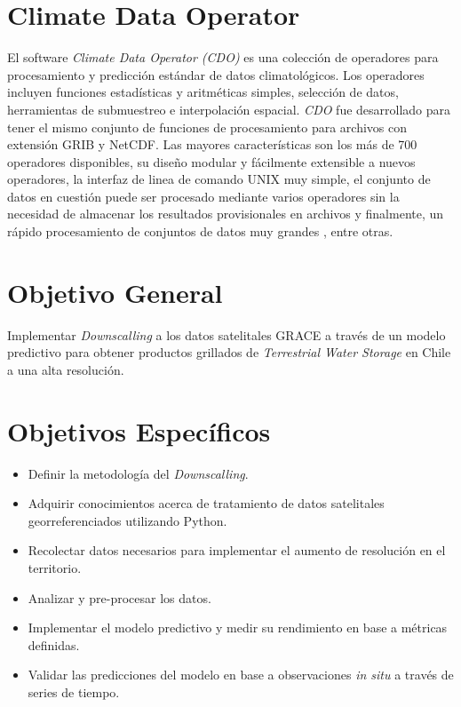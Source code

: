 %
%
%
%
\section{Climate Data Operator}
El software \textit{Climate Data Operator (CDO)} es una colección de operadores para procesamiento y predicción estándar de datos climatológicos.
Los operadores incluyen funciones estadísticas y aritméticas simples, selección de datos, herramientas de submuestreo e interpolación espacial.
\textit{CDO} fue desarrollado para tener el mismo conjunto de funciones de procesamiento para archivos con extensión GRIB y NetCDF. Las mayores características son
los más de 700 operadores disponibles, su diseño modular y fácilmente extensible a nuevos operadores, la interfaz de linea de comando UNIX muy simple,
el conjunto de datos en cuestión puede ser procesado mediante varios operadores sin la necesidad de almacenar los resultados provisionales en archivos y finalmente, un rápido procesamiento
de conjuntos de datos muy grandes \cite{16}, entre otras.
%
%
%
%
\section{Objetivo General}

Implementar \textit{Downscalling} a los datos satelitales GRACE a través de un modelo predictivo para obtener 
productos grillados de \textit{Terrestrial Water Storage} en Chile a una alta resolución.
%
%
%
%
\section{Objetivos Específicos}
\begin{itemize}
    \item Definir la metodología del \textit{Downscalling}.
    \item Adquirir conocimientos acerca de tratamiento de datos satelitales georreferenciados utilizando Python.
    \item Recolectar datos necesarios para implementar el aumento de resolución en el territorio.
    \item Analizar y pre-procesar los datos. 
    \item Implementar el modelo predictivo y medir su rendimiento en base a métricas definidas.
    \item Validar las predicciones del modelo en base a observaciones \textit{in situ} a través de series de tiempo.
\end{itemize}